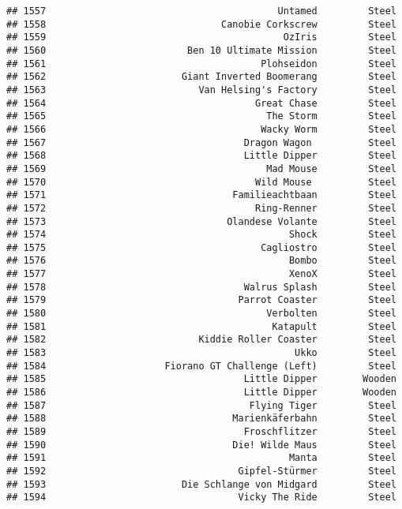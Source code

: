 \documentclass[
]{article}
\begin{document}
\begin{verbatim}
## 1557                                         Untamed         Steel
## 1558                               Canobie Corkscrew         Steel
## 1559                                          OzIris         Steel
## 1560                         Ben 10 Ultimate Mission         Steel
## 1561                                      Plohseidon         Steel
## 1562                        Giant Inverted Boomerang         Steel
## 1563                           Van Helsing's Factory         Steel
## 1564                                     Great Chase         Steel
## 1565                                       The Storm         Steel
## 1566                                      Wacky Worm         Steel
## 1567                                   Dragon Wagon          Steel
## 1568                                   Little Dipper         Steel
## 1569                                       Mad Mouse         Steel
## 1570                                     Wild Mouse          Steel
## 1571                                 Familieachtbaan         Steel
## 1572                                     Ring-Renner         Steel
## 1573                                Olandese Volante         Steel
## 1574                                           Shock         Steel
## 1575                                      Cagliostro         Steel
## 1576                                           Bombo         Steel
## 1577                                           XenoX         Steel
## 1578                                   Walrus Splash         Steel
## 1579                                  Parrot Coaster         Steel
## 1580                                       Verbolten         Steel
## 1581                                        Katapult         Steel
## 1582                           Kiddie Roller Coaster         Steel
## 1583                                            Ukko         Steel
## 1584                     Fiorano GT Challenge (Left)         Steel
## 1585                                   Little Dipper        Wooden
## 1586                                   Little Dipper        Wooden
## 1587                                    Flying Tiger         Steel
## 1588                                 Marienkäferbahn         Steel
## 1589                                   Froschflitzer         Steel
## 1590                                 Die! Wilde Maus         Steel
## 1591                                           Manta         Steel
## 1592                                  Gipfel-Stürmer         Steel
## 1593                        Die Schlange von Midgard         Steel
## 1594                                  Vicky The Ride         Steel

\end{verbatim}
\end{document}
